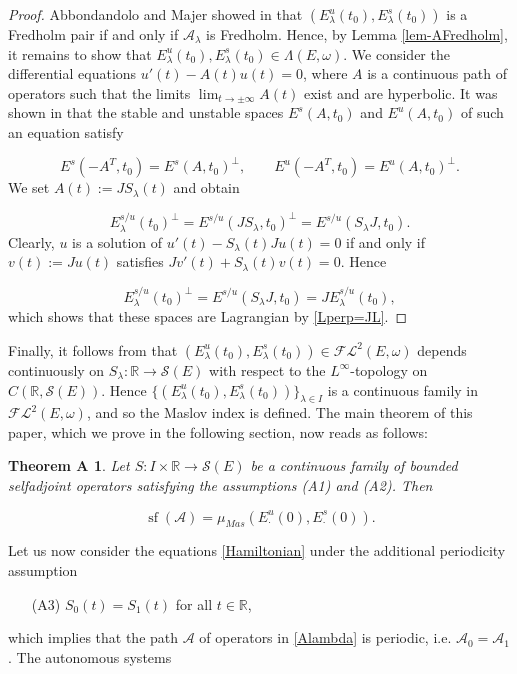 \documentclass[a4paper,10pt]{article}
\newtheorem*{theoremA}{Theorem A}
\DeclareMathOperator{\sfl}{sf}
\begin{document}
\begin{proof}
Abbondandolo and Majer showed in \cite[Thm. D]{AlbertoODE} that $(E^u_\lambda(t_0),E^s_\lambda(t_0))$ is a Fredholm pair if and only if $\mathcal{A}_\lambda$ is Fredholm. Hence, by Lemma \ref{lem-AFredholm}, it remains to show that $E^u_\lambda(t_0), E^s_\lambda(t_0)\in \Lambda(E,\omega)$. We consider the differential equations $u'(t)-A(t)u(t)=0$, where $A$ is a continuous path of operators such that the limits $\lim_{t\rightarrow\pm\infty} A(t)$ exist and are hyperbolic. It was shown in \cite[Thm. 2.1]{AlbertoODE} that the stable and unstable spaces $E^s(A,t_0)$ and $E^u(A,t_0)$ of such an equation satisfy

\[E^s(-A^T,t_0)=E^s(A,t_0)^\perp,\qquad E^u(-A^T,t_0)=E^u(A,t_0)^\perp.\]
We set $A(t):=JS_\lambda(t)$ and obtain

\[E^{s/u}_\lambda(t_0)^\perp=E^{s/u}(JS_\lambda,t_0)^\perp=E^{s/u}(S_\lambda J,t_0).\]
Clearly, $u$ is a solution of $u'(t)-S_\lambda(t)Ju(t)=0$ if and only if $v(t):=Ju(t)$ satisfies $Jv'(t)+S_\lambda(t)v(t)=0$. Hence

\[E^{s/u}_\lambda(t_0)^\perp=E^{s/u}(S_\lambda J,t_0)=JE^{s/u}_\lambda(t_0),\]
which shows that these spaces are Lagrangian by \eqref{Lperp=JL}.
\end{proof}
\noindent
Finally, it follows from \cite[Thm. 3.1]{AlbertoODE} that $(E^u_\lambda(t_0),E^s_\lambda(t_0))\in\mathcal{FL}^2(E,\omega)$ depends continuously on $S_\lambda:\mathbb{R}\rightarrow\mathcal{S}(E)$ with respect to the $L^\infty$-topology on $C(\mathbb{R},\mathcal{S}(E))$. Hence $\{(E^u_\lambda(t_0),E^s_\lambda(t_0))\}_{\lambda\in I}$ is a continuous family in $\mathcal{FL}^2(E,\omega)$, and so the Maslov index is defined. The main theorem of this paper, which we prove in the following section, now reads as follows: 


\begin{theoremA}\label{mainHomoclinics}
Let $S:I\times\mathbb{R}\rightarrow\mathcal{S}(E)$ be a continuous family of bounded selfadjoint operators satisfying the assumptions (A1) and (A2). Then 

\[\sfl(\mathcal{A})=\mu_{Mas}(E^u_\cdot(0),E^s_\cdot(0)).\]
\end{theoremA}
\noindent
Let us now consider the equations \eqref{Hamiltonian} under the additional periodicity assumption

\begin{itemize}
\item[(A3)] $S_0(t)=S_1(t)$ for all $t\in\mathbb{R}$,
\end{itemize} 
which implies that the path $\mathcal{A}$ of operators in \eqref{Alambda} is periodic, i.e. $\mathcal{A}_0=\mathcal{A}_1$. The autonomous systems
\end{document}
